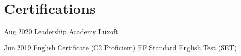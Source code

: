 
\section{Certifications}

\dateitem
    {Aug 2020}
    {Leadership Academy}
    {Luxoft}

\dateitem
    {Jun 2019}
    {English Certificate (C2 Proficient)}
    {\href{https://www.efset.org/cert/BAUjza}{EF Standard English Test (SET)}}
